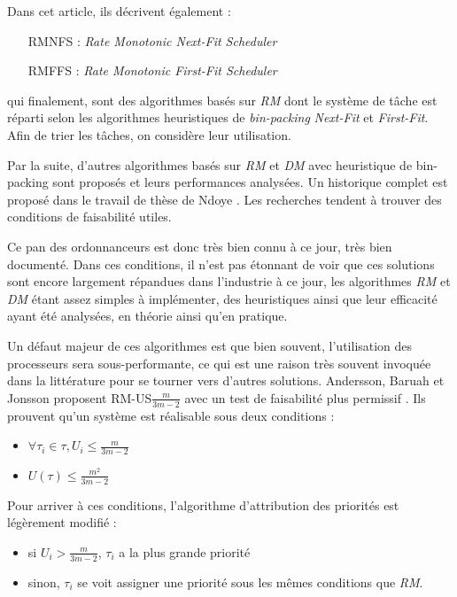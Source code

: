 \documentclass[11pt,a4paper,oneside]{report}
\begin{document}
	Dans cet article, ils décrivent également :\medskip
	\begin{itemize}
		\item[RMNFS] : \textit{Rate Monotonic Next-Fit Scheduler}
		\item[RMFFS] : \textit{Rate Monotonic First-Fit Scheduler}
	\end{itemize}
	\vspace{1em}
	qui finalement, sont des algorithmes basés sur \textit{RM} dont le système de tâche est 
	réparti selon les algorithmes heuristiques de \textit{bin-packing} \textit{Next-Fit} et \textit{First-Fit}. 
	Afin de trier les tâches, on considère leur utilisation.
	
	Par la suite, d'autres algorithmes basés sur \textit{RM} et \textit{DM} avec 
	heuristique de bin-packing sont proposés et leurs performances analysées. 
	Un historique complet est proposé dans le travail de thèse de Ndoye \cite{ndoye_ordonnancement_2014}. 
	Les recherches tendent à trouver des conditions de faisabilité utiles.\medskip
	
	Ce pan des ordonnanceurs est donc très bien connu à ce jour, très bien documenté. 
	Dans ces conditions, il n'est pas étonnant de voir que ces solutions sont encore largement 
	répandues dans l'industrie à ce jour, les algorithmes \textit{RM} et \textit{DM} 
	étant assez simples à implémenter, des heuristiques ainsi que leur efficacité ayant été analysées, en théorie ainsi qu'en pratique.\medskip
	
	Un défaut majeur de ces algorithmes est que bien souvent, l'utilisation des processeurs sera 
	sous-performante, ce qui est une raison très souvent invoquée dans la littérature pour se 
	tourner vers d'autres solutions. 
	Andersson, Baruah et Jonsson proposent RM-US$\frac{m}{3m-2}$ avec un test 
	de faisabilité plus permissif \cite{andersson_static-priority_2001}. Ils prouvent 
	qu'un système est réalisable sous deux conditions :\medskip
	\begin{itemize}
		\item $\forall \tau_i \in \tau, U_i \leq \frac{m}{3m-2}$
		\item $U(\tau) \leq \frac{m^2}{3m-2}$ 
	\end{itemize}
	\vspace{1em}
	Pour arriver à ces conditions, l'algorithme d'attribution des priorités est légèrement modifié : \medskip
	\begin{itemize}
		\item si $U_i > \frac{m}{3m-2}$, $\tau_i$ a la plus grande priorité
		\item sinon, $\tau_i$ se voit assigner une priorité sous les mêmes conditions que \textit{RM}.
	\end{itemize}
	
\end{document}
